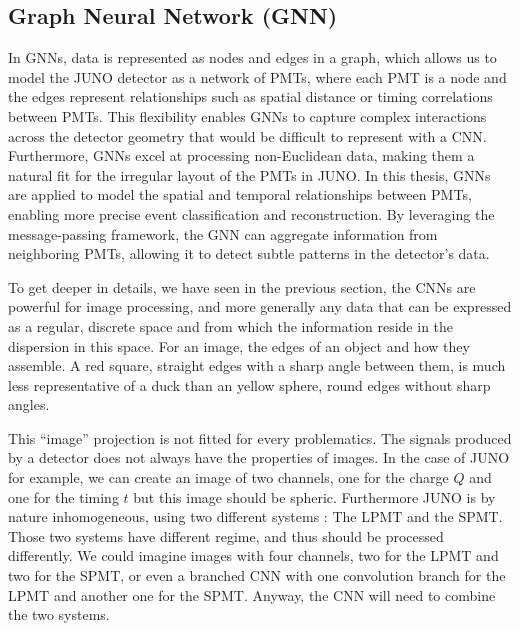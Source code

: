 \documentclass[../main.tex]{subfiles}
\begin{document}
\subsection{Graph Neural Network (GNN)}
\label{sec:ml:gnn}

In GNNs, data is represented as nodes and edges in a graph, which allows us to model the JUNO detector as a network of PMTs, where each PMT is a node and the edges represent relationships such as spatial distance or timing correlations between PMTs. This flexibility enables GNNs to capture complex interactions across the detector geometry that would be difficult to represent with a CNN. Furthermore, GNNs excel at processing non-Euclidean data, making them a natural fit for the irregular layout of the PMTs in JUNO.
In this thesis, GNNs are applied to model the spatial and temporal relationships between PMTs, enabling more precise event classification and reconstruction. By leveraging the message-passing framework, the GNN can aggregate information from neighboring PMTs, allowing it to detect subtle patterns in the detector's data.

To get deeper in details, we have seen in the previous section, the CNNs are powerful for image processing, and more generally any data that can be expressed as a regular, discrete space and from which the information reside in the dispersion in this space. For an image, the edges of an object and how they assemble. A red square, straight edges with a sharp angle between them, is much less representative of a duck than an yellow sphere, round edges without sharp angles.

This ``image'' projection is not fitted for every problematics. The signals produced by a detector does not always have the properties of images. In the case of JUNO for example, we can create an image of two channels, one for the charge $Q$ and one for the timing $t$ but this image should be spheric. Furthermore JUNO is by nature inhomogeneous, using two different systems : The LPMT and the SPMT. Those two systems have different regime, and thus should be processed differently. We could imagine images with four channels, two for the LPMT and two for the SPMT, or even a branched CNN with one convolution branch for the LPMT and another one for the SPMT. Anyway, the CNN will need to combine the two systems.
\end{document}
